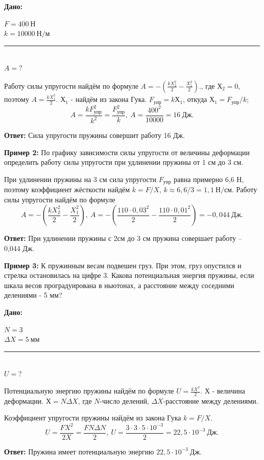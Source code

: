 \documentclass[a6paper, 11pt]{diss_4}
\renewcommand{\'}{\,'}
\begin{document}
\hspace{1cm}\textbf{Дано:}\hspace{.3cm}
\parbox[t]{4cm}{
$F= 400\ Н$\\
$k=10000\ Н/м$\\
\rule{4cm}{.4pt}\\
$A = ?$\\
}


Работу силы упругости найдём по формуле $A=-(\frac{kX_2^2}{2}-\frac{X_1^2}{2}).$, где $Х_2=0$, поэтому $A=\frac{kX_1^2}{2}$.
$Х_1$ - найдём из закона Гука. $F_{упр}=kХ_1$, откуда $Х_1=F_{упр}/k$;
\[
A=\frac{kF_{упр}^2}{k^2}=\frac{F_{упр}^2}{k},\
A=\frac{400^2}{10000}=16\ Дж.
\]

\textbf{Ответ:} Сила упругости пружины совершит работу 16 Дж.


\textbf{Пример 2:} По графику зависимости силы упругости от величины деформации определить работу силы упругости при удлинении пружины от 1 см до 3 см.

При удлинении пружины на 3 см сила упругости $F_{упр}$ равна примерно 6,6 Н, поэтому коэффициент жёсткости найдём $k=F/X$,
$k\approx6,6/3=1,1\ Н/см$. Работу силы упругости найдём по формуле
\[
A=-(\frac{kX_2^2}{2}-\frac{X_1^2}{2}),\ A=-(\frac{110\cdot0,03^2}{2}-\frac{110\cdot0,01^2}{2})= -0,044\ Дж.
\]

\textbf{Ответ:} При удлинении пружины с 2см до 3 см пружина совершает работу -- 0,044 Дж.

\textbf{Пример 3:} К пружинным весам подвешен груз. При этом, груз опустился и стрелка остановилась на цифре 3. Какова потенциальная энергия пружины, если шкала весов проградуирована в ньютонах, а расстояние между соседними делениями - 5 мм?

\hspace{1cm}\textbf{Дано:}\hspace{.3cm}
\parbox[t]{4cm}{
$N= 3$\\
$\Delta X=5\ мм$\\
\rule{4cm}{.4pt}\\
$U = ?$\\
}

Потенциальную энергию пружины найдём по формуле $U=\frac{kX^2}{2}$. $Х$ - величина деформации. $Х =N\Delta X$,
где $N$-число делений, $\Delta X$-расстояние между делениями.

Коэффициент упругости пружины найдём из закона Гука $k=F/X$.
\[
U=\frac{FX^2}{2X}=\frac{FN\Delta N}{2},\
U=\frac{3\cdot3\cdot5\cdot10^{-3}}{2}=22,5\cdot10^{-3}\ Дж.
\]

\textbf{Ответ:} Пружина имеет потенциальную энергию $22,5\cdot10^{-3}\ Дж$.
\end{document}
